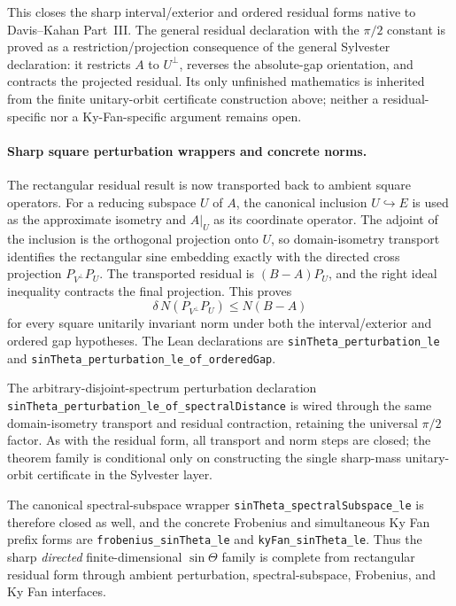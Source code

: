 \documentclass[11pt]{article}
\theoremstyle{remark}
\begin{document}
This closes the sharp interval/exterior and ordered residual forms native to
Davis--Kahan Part~III.  The general residual declaration with the $\pi/2$
constant is proved as a restriction/projection consequence of the general
Sylvester declaration: it restricts $A$ to $U^{\perp}$, reverses the
absolute-gap orientation, and contracts the projected residual.  Its only
unfinished mathematics is inherited from the finite unitary-orbit certificate
construction above; neither a residual-specific nor a Ky-Fan-specific argument
remains open.

\paragraph{Sharp square perturbation wrappers and concrete norms.}
The rectangular residual result is now transported back to ambient square
operators.  For a reducing subspace $U$ of $A$, the canonical inclusion
$U\hookrightarrow E$ is used as the approximate isometry and
$A|_U$ as its coordinate operator.  The adjoint of the inclusion is the
orthogonal projection onto $U$, so domain-isometry transport identifies the
rectangular sine embedding exactly with the directed cross projection
$P_{V^\perp}P_U$.  The transported residual is
$(B-A)P_U$, and the right ideal inequality contracts the final projection.
This proves
\[
  \delta\,N(P_{V^\perp}P_U) \le N(B-A)
\]
for every square unitarily invariant norm under both the interval/exterior and
ordered gap hypotheses.  The Lean declarations are
\texttt{sinTheta\_perturbation\_le} and
\texttt{sinTheta\_perturbation\_le\_of\_orderedGap}.

The arbitrary-disjoint-spectrum perturbation declaration
\texttt{sinTheta\_perturbation\_le\_of\_}\allowbreak\texttt{spectralDistance} is wired through
the same domain-isometry transport and residual contraction, retaining the
universal $\pi/2$ factor.  As with the residual form, all transport and norm
steps are closed; the theorem family is conditional only on constructing the
single sharp-mass unitary-orbit certificate in the Sylvester layer.

The canonical spectral-subspace wrapper
\texttt{sinTheta\_spectralSubspace\_le} is therefore closed as well, and
the concrete Frobenius and simultaneous Ky Fan prefix forms are
\texttt{frobenius\_sinTheta\_le} and
\texttt{kyFan\_sinTheta\_le}.  Thus the sharp \emph{directed} finite-dimensional
$\sin\Theta$ family is complete from rectangular residual form through
ambient perturbation, spectral-subspace, Frobenius, and Ky Fan interfaces.
\end{document}
